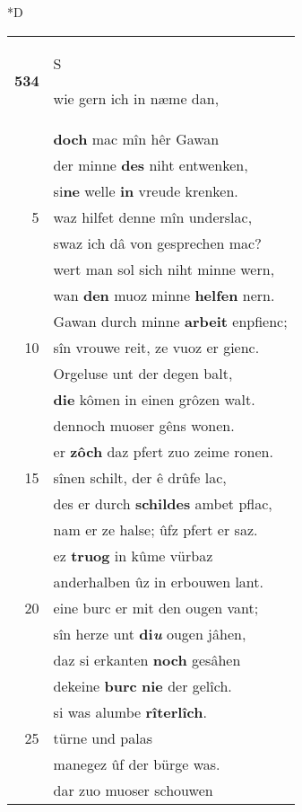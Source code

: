 \documentclass[8pt,a4paper,notitlepage]{article}
\begin{document}
\begin{table}[ht]
\begin{minipage}[t]{0.5\linewidth}
\small
\begin{center}*D
\end{center}
\begin{tabular}{rl}
\textbf{534} & \begin{large}S\end{large}wie gern ich in næme dan,\\ 
 & \textbf{doch} mac mîn hêr Gawan\\ 
 & der minne \textbf{des} niht entwenken,\\ 
 & si\textbf{ne} welle \textbf{in} vreude krenken.\\ 
5 & waz hilfet denne mîn underslac,\\ 
 & swaz ich dâ von gesprechen mac?\\ 
 & wert man sol sich niht minne wern,\\ 
 & wan \textbf{den} muoz minne \textbf{helfen} nern.\\ 
 & Gawan durch minne \textbf{arbeit} enpfienc;\\ 
10 & sîn vrouwe reit, ze vuoz er gienc.\\ 
 & Orgeluse unt der degen balt,\\ 
 & \textbf{die} kômen in einen grôzen walt.\\ 
 & dennoch muoser gêns wonen.\\ 
 & er \textbf{zôch} daz pfert zuo zeime ronen.\\ 
15 & sînen schilt, der ê drûfe lac,\\ 
 & des er durch \textbf{schildes} ambet pflac,\\ 
 & nam er ze halse; ûfz pfert er saz.\\ 
 & ez \textbf{truog} in kûme vürbaz\\ 
 & anderhalben ûz in erbouwen lant.\\ 
20 & eine burc er mit den ougen vant;\\ 
 & sîn herze unt \textbf{di\textit{u}} ougen jâhen,\\ 
 & daz si erkanten \textbf{noch} gesâhen\\ 
 & dekeine \textbf{burc} \textbf{nie} der gelîch.\\ 
 & si was alumbe \textbf{rîterlîch}.\\ 
25 & türne und palas\\ 
 & manegez ûf der bürge was.\\ 
 & dar zuo muoser schouwen\\ 

\end{tabular}
\end{minipage}
\end{table}
\end{document}
